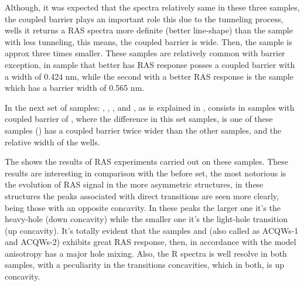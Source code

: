 Although, it was  expected that the spectra relatively same in these three samples, the coupled barrier plays an important role this due to the tunneling process,  wells it returns a \gls{RAS} spectra more definite (better line-shape) than the sample with less tunneling, this means, the coupled barrier is wide. Then, the sample  is approx three times smaller. These samples are relatively common with barrier exception, in sample  that  better has \gls{RAS} response posses a coupled barrier with a width of 0.424 nm, while the second with a better RAS response is the sample  which has a barrier width of 0.565 nm.  

In the next set of samples: ,  ,  ,   and  , as  is explained in , consists in samples with coupled barrier of , where the difference in this set samples, is one  of these samples () has a coupled barrier  twice wider than the other samples, and the relative width of the wells. 

The  shows the results of \gls{RAS} experiments carried out on these samples. These results are interesting in comparison with the before set,  the most notorious is the evolution of \gls{RAS} signal in the more asymmetric structures, in these structures the peaks associated with direct transitions are seen more clearly, being those with an opposite concavity. In these peaks the larger one it's the heavy-hole (down concavity) while the  smaller one it's the light-hole transition (up concavity). It's totally evident that the samples  and  (also called as ACQWs-1 and ACQWs-2) exhibits great \gls{RAS} response, then, in  accordance with the model anisotropy  has a major hole mixing.  Also, the \gls{R} spectra is well resolve in both samples, with a peculiarity in the transitions concavities, which in both, is up concavity. 

